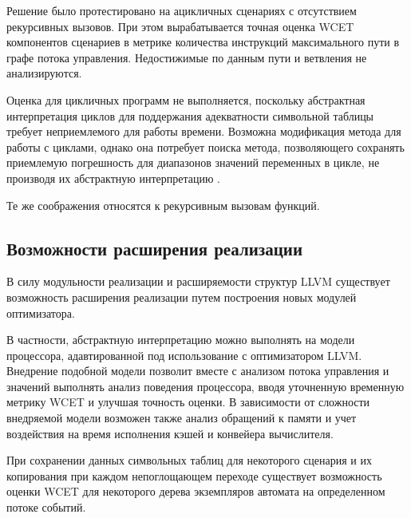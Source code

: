 \documentclass[12pt,a4paper]{article}
\begin{document}
Решение было протестировано на ацикличных сценариях с отсутствием рекурсивных вызовов. При этом вырабатывается точная оценка WCET компонентов сценариев в метрике количества инструкций максимального пути в графе потока управления. Недостижимые по данным пути и ветвления не анализируются.

Оценка для цикличных программ не выполняется, поскольку абстрактная интерпретация циклов для поддержания адекватности символьной таблицы требует неприемлемого для работы времени. Возможна модификация метода для работы с циклами, однако она потребует поиска метода, позволяющего сохранять приемлемую погрешность для диапазонов значений переменных в цикле, не производя их абстрактную интерпретацию \cite{bound}.

Те же соображения относятся к рекурсивным вызовам функций.

\subsection{Возможности расширения реализации}

В силу модульности реализации и расширяемости структур LLVM существует возможность расширения реализации путем построения новых модулей оптимизатора.

В частности, абстрактную интерпретацию можно выполнять на модели процессора, адавтированной под использование с оптимизатором LLVM. Внедрение подобной модели позволит вместе с анализом потока управления и значений выполнять анализ поведения процессора, вводя уточненную временную метрику WCET и улучшая точность оценки. В зависимости от сложности внедряемой модели возможен также анализ обращений к памяти и учет воздействия на время исполнения кэшей и конвейера вычислителя.

При сохранении данных символьных таблиц для некоторого сценария и их копирования при каждом непоглощающем переходе существует возможность оценки WCET для некоторого дерева экземпляров автомата на определенном потоке событий.
\end{document}
